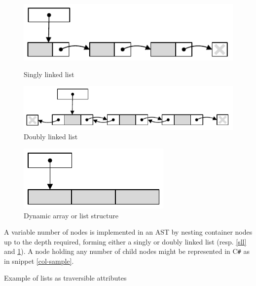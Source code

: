 \documentclass[twoside,openright]{uva-bachelor-thesis}
\newcommand{\cs}{C\texttt{\#}\xspace}
\begin{document}
		\begin{figure}[ht]
			\begin{minipage}[b]{0.45\linewidth}
				\centering
				\includegraphics[width=\textwidth]{figures/collections/sll}
				\caption{Singly linked list}
				\label{sll}
			\end{minipage}
			\hspace{0.5cm}
			\begin{minipage}[b]{0.45\linewidth}
				\centering
				\includegraphics[width=\textwidth]{figures/collections/dll}
				\caption{Doubly linked list}
				\label{dll}
			\end{minipage}
		\end{figure}
		\begin{figure}[h]
			\centering
			\includegraphics{figures/collections/list}
			\caption{Dynamic array or list structure}
			\label{list}
		\end{figure}
		
		A variable number of nodes is implemented in an AST by nesting container nodes up to the depth required, forming either a singly or doubly linked list (resp. \cref{sll} and \cref{dll}). A node holding any number of child nodes might be represented in \cs as in snippet \cref{col-sample}.

		\begin{codebox}[label=col-sample]{Example of lists as traversible attributes}
		\end{codebox}
	
\end{document}
